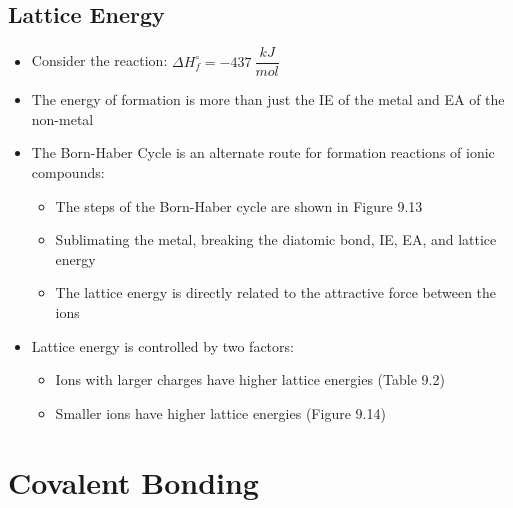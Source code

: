\documentclass[12pt, openany, letterpaper]{memoir}
\begin{document}
\section{Lattice Energy}
\begin{itemize}
	\item Consider the reaction:  \hspace{1em}$\Delta H^\circ_f = -437~\dfrac{kJ}{mol}$
	\item The energy of formation is more than just the IE of the metal and EA of the non-metal
	\item The Born-Haber Cycle is an alternate route for formation reactions of ionic compounds:
	      \begin{itemize}
		      \item The steps of the Born-Haber cycle are shown in Figure 9.13
		      \item Sublimating the metal, breaking the diatomic bond, IE, EA, and lattice energy
		      \item The lattice energy is directly related to the attractive force between the ions
	      \end{itemize}
	\item Lattice energy is controlled by two factors:
	      \begin{itemize}
		      \item Ions with larger charges have higher lattice energies (Table 9.2)
		      \item Smaller ions have higher lattice energies (Figure 9.14)
	      \end{itemize}
\end{itemize}

\chapter{Covalent Bonding}
\end{document}
